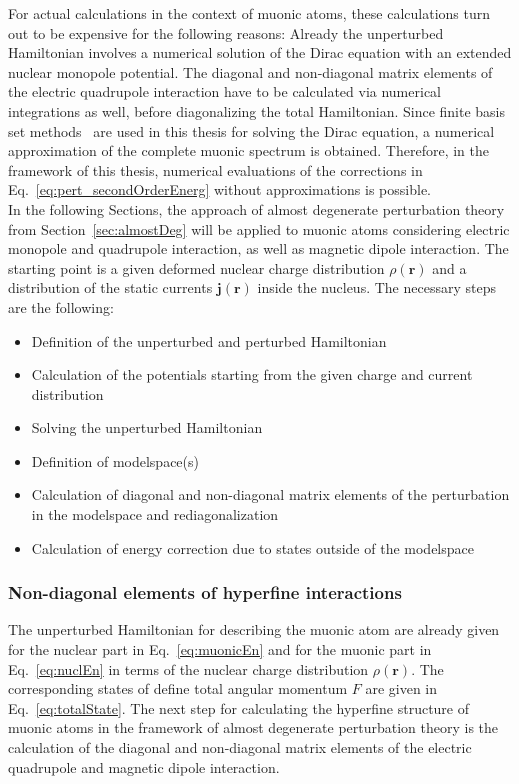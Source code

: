 For actual calculations in the context of muonic atoms, these calculations turn out to be expensive for the following reasons: Already the unperturbed Hamiltonian involves a numerical solution of the Dirac equation with an extended nuclear monopole potential. The diagonal and non-diagonal matrix elements of the electric quadrupole interaction have to be calculated via numerical integrations as well, before diagonalizing the total Hamiltonian. Since finite basis set methods~\cite{Shabaev2004} are used in this thesis for solving the Dirac equation, a numerical approximation of the complete muonic spectrum is obtained. Therefore, in the framework of this thesis, numerical evaluations of the corrections in Eq.~\eqref{eq:pert_secondOrderEnerg} without approximations is possible.\\ 

In the following Sections, the approach of almost degenerate perturbation theory from Section~\ref{sec:almostDeg} will be applied to muonic atoms considering electric monopole and quadrupole interaction, as well as magnetic dipole interaction. The starting point is a given deformed nuclear charge distribution $\rho(\mathbf{r})$ and a distribution of the static currents $\mathbf{j}(\mathbf{r})$ inside the nucleus.
The necessary steps are the following:
\begin{itemize}
\item Definition of the unperturbed  and perturbed Hamiltonian
\item Calculation of the potentials starting from the given charge and current distribution
\item Solving the unperturbed Hamiltonian
\item Definition of modelspace(s)
\item Calculation of diagonal and non-diagonal matrix elements of the perturbation in the modelspace and rediagonalization
\item Calculation of energy correction due to states outside of the modelspace
\end{itemize}


\subsubsection{Non-diagonal elements of hyperfine interactions}
The unperturbed Hamiltonian for describing the muonic atom are already given for the nuclear part in Eq.~\eqref{eq:muonicEn} and for the muonic part in Eq.~\eqref{eq:nuclEn} in terms of the nuclear charge distribution $\rho(\mathbf{r})$. The corresponding states of define total angular momentum $F$ are given in Eq.~\eqref{eq:totalState}.
The next step for calculating the hyperfine structure of muonic atoms in the framework of almost degenerate perturbation theory is the calculation of the diagonal and non-diagonal matrix elements of the electric quadrupole and magnetic dipole interaction.

